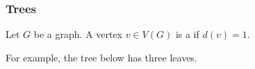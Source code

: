 \documentclass[11pt, mathserif]{beamer}
\theoremstyle{definition}
\theoremstyle{remark}
\begin{document}
\begin{frame}
  \frametitle{Trees}

  
\begin{definition}[Leaf]
	Let $G$ be a graph. A vertex $v \in V(G)$ is a  if $d(v) = 1$.
\end{definition}

\vspace{2\baselineskip}

For example, the tree below has three leaves.
\begin{center}
	


\begin{tikzpicture}[x=0.75pt,y=0.75pt,yscale=-1,xscale=1]


\end{tikzpicture}
\end{center}
\end{frame}
\end{document}

